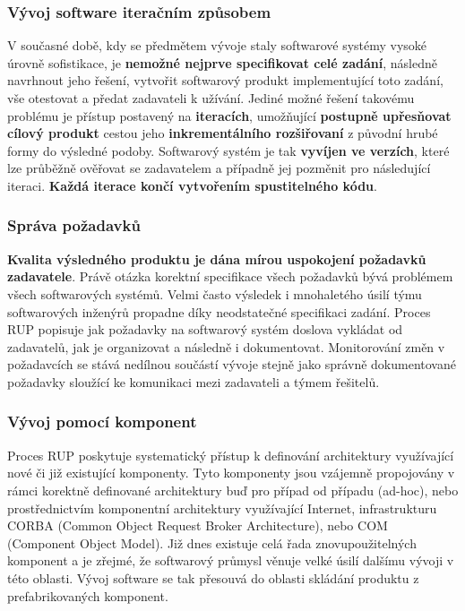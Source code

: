 \subsubsection{Vývoj software iteračním způsobem}
V současné době, kdy se předmětem vývoje staly softwarové systémy vysoké úrovně sofistikace, je \textbf{nemožné nejprve specifikovat celé zadání}, následně navrhnout jeho řešení, vytvořit softwarový produkt implementující toto zadání, vše otestovat a předat zadavateli k užívání. Jediné možné řešení takovému problému je přístup postavený na \textbf{iteracích}, umožňující \textbf{postupně upřesňovat cílový produkt} cestou jeho \textbf{inkrementálního rozšiřovaní} z původní hrubé formy do výsledné podoby.  Softwarový systém je tak \textbf{vyvíjen ve verzích}, které lze průběžně ověřovat se zadavatelem a případně jej pozměnit pro následující iteraci. \textbf{Každá iterace končí vytvořením spustitelného kódu}.

\subsubsection{Správa požadavků}
\textbf{Kvalita výsledného produktu je dána mírou uspokojení požadavků zadavatele}. Právě otázka korektní specifikace všech požadavků bývá problémem všech softwarových systémů. Velmi často výsledek i mnohaletého úsilí týmu softwarových inženýrů propadne díky neodstatečné specifikaci zadání. Proces RUP popisuje jak požadavky na softwarový systém doslova vykládat od zadavatelů, jak je organizovat a následně i dokumentovat. Monitorování změn v požadavcích se stává nedílnou součástí vývoje stejně jako správně dokumentované požadavky sloužící ke komunikaci mezi zadavateli a týmem řešitelů.

\subsubsection{Vývoj pomocí komponent}
Proces RUP poskytuje systematický přístup k definování architektury využívající nové či již existující komponenty. Tyto komponenty jsou vzájemně propojovány v rámci korektně definované architektury buď pro případ od případu (ad-hoc), nebo prostřednictvím komponentní architektury využívající Internet, infrastrukturu CORBA (Common Object Request Broker Architecture), nebo COM (Component Object Model). Již dnes existuje celá řada znovupoužitelných komponent a je zřejmé, že softwarový průmysl věnuje velké úsilí dalšímu vývoji v této oblasti. Vývoj software se tak přesouvá do oblasti skládání produktu z prefabrikovaných komponent.

